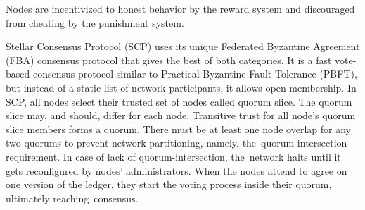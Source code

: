 \documentclass[applsci,article,accept,moreauthors,pdftex]{Definitions/mdpi}
\begin{document}
Nodes are incentivized to honest behavior by the reward system and discouraged from cheating by the punishment system. 

Stellar Consensus Protocol (SCP) uses its unique Federated Byzantine Agreement (FBA) consensus protocol that gives the best of both categories. It is a fast vote-based consensus protocol similar to Practical Byzantine Fault Tolerance (PBFT), but instead of a static list of network participants, it allows open membership.
In SCP, all nodes select their trusted set of nodes called quorum slice. The quorum slice may, and should, differ for each node. Transitive trust for all node's quorum slice members forms a quorum. There must be at least one node overlap for any two quorums to prevent network partitioning, namely, the~quorum-intersection requirement. In case of lack of quorum-intersection, the~network halts until it gets reconfigured by nodes' administrators. When the nodes attend to agree on one version of the ledger, they start the voting process inside their quorum, ultimately reaching~consensus.
\end{document}
